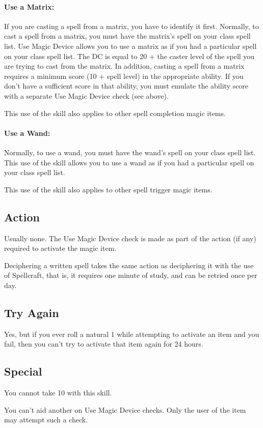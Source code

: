 \paragraph{Use a Matrix:}
If you are casting a spell from a matrix, you have to identify it first. 
Normally, to cast a spell from a matrix, you must have the matrix's spell on your class spell list. 
Use Magic Device allows you to use a matrix as if you had a particular spell on your class spell list. 
The DC is equal to 20 + the caster level of the spell you are trying to cast from the matrix.
In addition, casting a spell from a matrix requires a minimum score (10 + spell level) in the appropriate ability. 
If you don't have a sufficient score in that ability, you must emulate the ability score with a separate Use Magic Device check (see above).

This use of the skill also applies to other spell completion magic items.
\paragraph{Use a Wand:}
Normally, to use a wand, you must have the wand's spell on your class spell list. 
This use of the skill allows you to use a wand as if you had a particular spell on your class spell list. 

This use of the skill also applies to other spell trigger magic items.%
\subsection{Action}
Usually none. The Use Magic Device check is made as part of the action (if any) required to activate the magic item.

Deciphering a written spell takes the same action as deciphering it with the use of Spellcraft, that is, it requires one minute of study, and can be retried once per day.
\subsection{Try Again}
Yes, but if you ever roll a natural 1 while attempting to activate an item and you fail, then you can't try to activate that item again for 24 hours.
\subsection{Special}
You cannot take 10 with this skill.

You can't aid another on Use Magic Device checks. Only the user of the item may attempt such a check.

